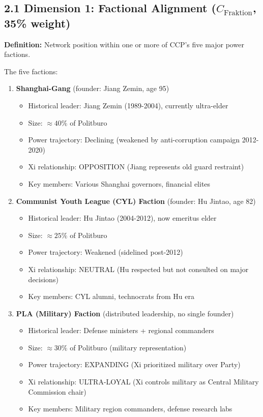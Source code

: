 \documentclass[11pt]{article}
\begin{document}
\subsection{2.1 Dimension 1: Factional Alignment ($C_{\text{Fraktion}}$, 35\% weight)}

\textbf{Definition:} Network position within one or more of CCP's five major power factions.

The five factions:

\begin{enumerate}
\item \textbf{Shanghai-Gang} (founder: Jiang Zemin, age 95)
   \begin{itemize}
   \item Historical leader: Jiang Zemin (1989-2004), currently ultra-elder
   \item Size: $\approx 40\%$ of Politburo
   \item Power trajectory: Declining (weakened by anti-corruption campaign 2012-2020)
   \item Xi relationship: OPPOSITION (Jiang represents old guard restraint)
   \item Key members: Various Shanghai governors, financial elites
   \end{itemize}

\item \textbf{Communist Youth League (CYL) Faction} (founder: Hu Jintao, age 82)
   \begin{itemize}
   \item Historical leader: Hu Jintao (2004-2012), now emeritus elder
   \item Size: $\approx 25\%$ of Politburo
   \item Power trajectory: Weakened (sidelined post-2012)
   \item Xi relationship: NEUTRAL (Hu respected but not consulted on major decisions)
   \item Key members: CYL alumni, technocrats from Hu era
   \end{itemize}

\item \textbf{PLA (Military) Faction} (distributed leadership, no single founder)
   \begin{itemize}
   \item Historical leader: Defense ministers + regional commanders
   \item Size: $\approx 30\%$ of Politburo (military representation)
   \item Power trajectory: EXPANDING (Xi prioritized military over Party)
   \item Xi relationship: ULTRA-LOYAL (Xi controls military as Central Military Commission chair)
   \item Key members: Military region commanders, defense research labs
   \end{itemize}


\end{enumerate}
\end{document}

